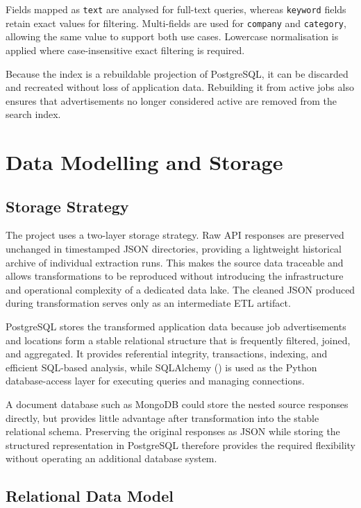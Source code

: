 \documentclass[11pt,a4paper]{article}
\begin{document}
Fields mapped as \texttt{text} are analysed for full-text queries, whereas \texttt{keyword} fields retain exact values for filtering. Multi-fields are used for \texttt{company} and \texttt{category}, allowing the same value to support both use cases. Lowercase normalisation is applied where case-insensitive exact filtering is required.

Because the index is a rebuildable projection of PostgreSQL, it can be discarded and recreated without loss of application data. Rebuilding it from active jobs also ensures that advertisements no longer considered active are removed from the search index.




\section{Data Modelling and Storage}


\subsection{Storage Strategy}

The project uses a two-layer storage strategy. Raw API responses are preserved unchanged in timestamped JSON directories, providing a lightweight historical archive of individual extraction runs. This makes the source data traceable and allows transformations to be reproduced without introducing the infrastructure and operational complexity of a dedicated data lake. The cleaned JSON produced during transformation serves only as an intermediate ETL artifact.

PostgreSQL stores the transformed application data because job advertisements and locations form a stable relational structure that is frequently filtered, joined, and aggregated. It provides referential integrity, transactions, indexing, and efficient SQL-based analysis, while SQLAlchemy (\cite{sqlalchemy-docs}) is used as the Python database-access layer for executing queries and managing connections.

A document database such as MongoDB could store the nested source responses directly, but provides little advantage after transformation into the stable relational schema. Preserving the original responses as JSON while storing the structured representation in PostgreSQL therefore provides the required flexibility without operating an additional database system.


\subsection{Relational Data Model}
\end{document}

